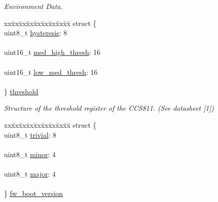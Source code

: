 \begin{DoxyCompactItemize}
\begin{tabbing}
\end{tabbing}\begin{DoxyCompactList}\small\item\em Environment Data. \end{DoxyCompactList}\item 
\begin{tabbing}
xx\=xx\=xx\=xx\=xx\=xx\=xx\=xx\=xx\=\kill
struct \{\\
\>uint8\_t \mbox{\hyperlink{union_application_register_a161e08a7c91bc23fa80f36171adead3f}{hysteresis}}: 8\\
\>\\
\>uint16\_t \mbox{\hyperlink{union_application_register_acd7612e6b462dac50feda9e19689ff0c}{med\_high\_thresh}}: 16\\
\>\\
\>uint16\_t \mbox{\hyperlink{union_application_register_ae69d84acc98da428ad66116e3daa99d8}{low\_med\_thresh}}: 16\\
\>\\
\} \mbox{\hyperlink{union_application_register_ad58c29130522c193feed876531baa90a}{threshold}}\\

\end{tabbing}\begin{DoxyCompactList}\small\item\em Structure of the threshold register of the C\+C\+S811. (See datasheet \mbox{[}1\mbox{]}) \end{DoxyCompactList}\item 
\begin{tabbing}
xx\=xx\=xx\=xx\=xx\=xx\=xx\=xx\=xx\=\kill
struct \{\\
\>uint8\_t \mbox{\hyperlink{union_application_register_a3b0d741a372e96fc6dd2cb18095e868c}{trivial}}: 8\\
\>\\
\>uint8\_t \mbox{\hyperlink{union_application_register_ae2f416b0a34b7beb4ed3873d791ac393}{minor}}: 4\\
\>\\
\>uint8\_t \mbox{\hyperlink{union_application_register_a5bd4e4c943762926c8f653b6224cced2}{major}}: 4\\
\>\\
\} \mbox{\hyperlink{union_application_register_acacf81aec22cc311505f2c2e8363e55f}{fw\_boot\_version}}\\


\end{tabbing}
\end{DoxyCompactItemize}

